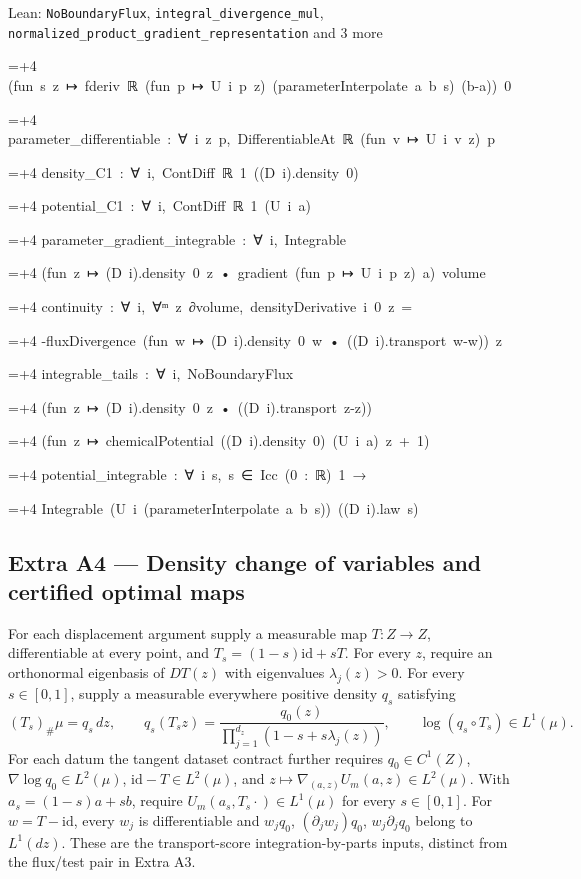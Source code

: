 \documentclass[11pt,a4paper]{report}
\newlength{\leancharwidth}
\newenvironment{leancode}{\par\smallskip\begingroup\ttfamily\footnotesize\raggedright
  \settowidth{\leancharwidth}{M}\setlength{\parskip}{0pt}\setlength{\parindent}{0pt}
  \frenchspacing}{\par\endgroup\smallskip}
\newcommand{\leanline}[2]{\hangindent=\dimexpr#1\leancharwidth+4\leancharwidth\relax
  \hangafter=1\noindent\hspace*{#1\leancharwidth}#2\par}
\begin{document}
\begin{leanbox}{Lean: \texttt{NoBoundaryFlux}, \texttt{integral\_\allowbreak{}divergence\_\allowbreak{}mul}, \texttt{normalized\_\allowbreak{}product\_\allowbreak{}gradient\_\allowbreak{}representation} and 3 more}
\begin{leancode}
\leanline{4}{(fun\ s\ z\ ↦\ fderiv\ ℝ\ (fun\ p\ ↦\ U\ i\ p\ z)\ (parameterInterpolate\ a\ b\ s)\ (b-a))\ 0}
\leanline{2}{parameter\_differentiable\ :\ ∀\ i\ z\ p,\ DifferentiableAt\ ℝ\ (fun\ v\ ↦\ U\ i\ v\ z)\ p}
\leanline{2}{density\_C1\ :\ ∀\ i,\ ContDiff\ ℝ\ 1\ ((D\ i).density\ 0)}
\leanline{2}{potential\_C1\ :\ ∀\ i,\ ContDiff\ ℝ\ 1\ (U\ i\ a)}
\leanline{2}{parameter\_gradient\_integrable\ :\ ∀\ i,\ Integrable}
\leanline{4}{(fun\ z\ ↦\ (D\ i).density\ 0\ z\ •\ gradient\ (fun\ p\ ↦\ U\ i\ p\ z)\ a)\ volume}
\leanline{2}{continuity\ :\ ∀\ i,\ ∀ᵐ\ z\ ∂volume,\ densityDerivative\ i\ 0\ z\ =}
\leanline{4}{-fluxDivergence\ (fun\ w\ ↦\ (D\ i).density\ 0\ w\ •\ ((D\ i).transport\ w-w))\ z}
\leanline{2}{integrable\_tails\ :\ ∀\ i,\ NoBoundaryFlux}
\leanline{4}{(fun\ z\ ↦\ (D\ i).density\ 0\ z\ •\ ((D\ i).transport\ z-z))}
\leanline{4}{(fun\ z\ ↦\ chemicalPotential\ ((D\ i).density\ 0)\ (U\ i\ a)\ z\ +\ 1)}
\leanline{2}{potential\_integrable\ :\ ∀\ i\ s,\ s\ ∈\ Icc\ (0\ :\ ℝ)\ 1\ →}
\leanline{4}{Integrable\ (U\ i\ (parameterInterpolate\ a\ b\ s))\ ((D\ i).law\ s)}
\end{leancode}
\end{leanbox}
\subsection{\texorpdfstring{Extra A4 — Density change of variables and certified optimal maps}{Extra A4 — Density change of variables and certified optimal maps}}


For each displacement argument supply a measurable map \(T:Z\to Z\), differentiable at every point, and \(T_s=(1-s)\mathrm{id}+sT\). For every \(z\), require an orthonormal eigenbasis of \(DT(z)\) with eigenvalues \(\lambda_j(z)>0\). For every \(s\in[0,1]\), supply a measurable everywhere positive density \(q_s\) satisfying
        \[(T_s)_\#\mu=q_s\,dz,\qquad
          q_s(T_s z)=\frac{q_0(z)}{\prod_{j=1}^{d_z}(1-s+s\lambda_j(z))},\qquad
          \log(q_s\circ T_s)\in L^1(\mu).\]
        For each datum the tangent dataset contract further requires \(q_0\in C^1(Z)\), \(\nabla\log q_0\in L^2(\mu)\), \(\mathrm{id}-T\in L^2(\mu)\), and \(z\mapsto\nabla_{(a,z)}U_m(a,z)\in L^2(\mu)\). With \(a_s=(1-s)a+sb\), require \(U_m(a_s,T_s\cdot)\in L^1(\mu)\) for every \(s\in[0,1]\). For \(w=T-\mathrm{id}\), every \(w_j\) is differentiable and \(w_jq_0\), \((\partial_jw_j)q_0\), \(w_j\partial_jq_0\) belong to \(L^1(dz)\). These are the transport-score integration-by-parts inputs, distinct from the flux/\allowbreak{}test pair in Extra A3.
\end{document}
